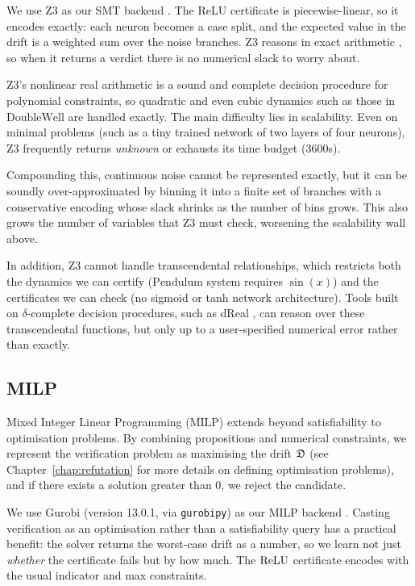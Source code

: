 We use Z3 as our SMT backend
\cite{demoura2008z3}. The ReLU certificate is piecewise-linear, so it
encodes exactly: each neuron becomes a case split, and the expected value in the
drift is a weighted sum over the noise branches. Z3 reasons in exact arithmetic
\cite{jovanovic2012nlsat},
so when it returns a verdict there is no numerical slack to worry about.

Z3's nonlinear real arithmetic is a sound and complete decision
procedure for polynomial constraints, so quadratic and even cubic dynamics such
as those in $\mathrm{DoubleWell}$ are handled exactly. The main difficulty lies in scalability.
Even on minimal problems (such as a tiny trained network of two layers of four neurons), Z3 frequently returns \emph{unknown} or exhausts its time budget (3600s).

Compounding this, continuous noise cannot be represented exactly, but it can be soundly over-approximated by binning it into a finite set
of branches with a conservative encoding whose slack shrinks as the number of bins
grows. This also grows the number of variables that Z3 must check, worsening the scalability wall above.

In addition, Z3 cannot handle transcendental relationships, which restricts both the dynamics we can certify ($\mathrm{Pendulum}$ system requires $\sin(x)$) and the certificates we can check (no sigmoid or tanh network architecture). Tools built on $\delta$-complete decision procedures, such as dReal
\cite{gao2013dreal}, can reason over these transcendental functions, but only up to a user-specified numerical error rather than exactly.

\subsection{MILP}

Mixed Integer Linear Programming (MILP) extends beyond satisfiability to optimisation problems. By combining propositions and numerical constraints, we represent the verification problem as maximising the drift $\mathfrak{D}$ (see Chapter~\ref{chap:refutation} for more details on defining optimisation problems), and if there exists a solution greater than 0, we reject the candidate.

We use Gurobi (version 13.0.1, via \texttt{gurobipy}) as our MILP backend
\cite{gurobi2026manual}. Casting verification as an optimisation
rather than a satisfiability query has a practical benefit: the solver returns
the worst-case drift as a number, so we learn not just \emph{whether} the
certificate fails but by how much. The $\mathrm{ReLU}$ certificate encodes with the usual
indicator and max constraints.

